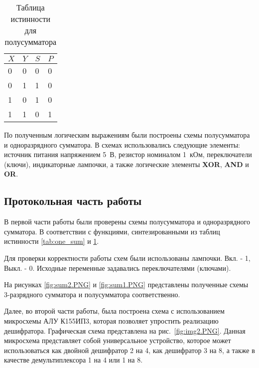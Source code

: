 \begin{table}[h!]
\centering
\caption{Таблица истинности для полусумматора}
\begin{tabularx}{\textwidth}{|X|X|X|X|}
\hline
$X$ & $Y$ & $S$ & $P$ \\ \hline
0 & 0 & 0 & 0 \\ \hline
0 & 1 & 1 & 0 \\ \hline
1 & 0 & 1 & 0 \\ \hline
1 & 1 & 0 & 1 \\ \hline
\end{tabularx}
\label{tab:half_sum}
\end{table}

\par По полученным логическим выражениям были построены схемы полусумматора и одноразрядного сумматора.
В схемах использовались следующие элементы: источник питания напряжением 5~В, резистор номиналом 1~кОм,
переключатели (ключи), индикаторные лампочки, а также логические элементы \textbf{XOR}, \textbf{AND} и \textbf{OR}.

\subsection*{Протокольная часть работы}

В первой части работы были проверены схемы полусумматора и одноразрядного сумматора. В соответствии с функциями, синтезированными из таблиц истинности \ref{tab:one_sum} и \ref{tab:half_sum}.

Для проверки корректности работы схем были использованы лампочки. Вкл. - 1, Выкл. - 0. Исходные переменные задавались переключателями (ключами).

На рисунках \ref{fig:sum2.PNG} и \ref{fig:sum1.PNG} представлены полученные схемы 3-разрядного сумматора и полусумматора соответственно.


Далее, во второй части работы, была построена схема с использованием микросхемы АЛУ К155ИП3, которая позволяет упростить реализацию дешифратора. Графическая схема представлена на рис.~\ref{fig:img2.PNG}. Данная микросхема представляет собой
универсальное устройство, которое может использоваться как двойной
дешифратор 2 на 4, как дешифратор 3 на 8, а также в качестве демультиплексора
1 на 4 или 1 на 8.



